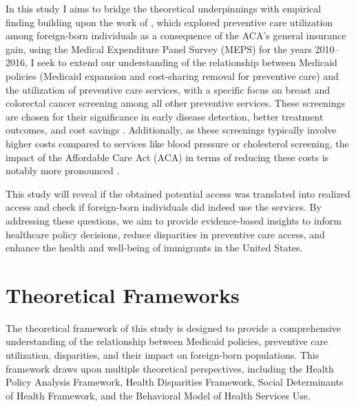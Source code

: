\documentclass[man]{apa7}
\begin{document}
In this study I aims to bridge the theoretical underpinnings with empirical finding  building upon the work of \parencite{li_gains_2021}, which explored preventive care utilization among foreign-born individuals as a consequence of the ACA's general insurance gain, using the Medical Expenditure Panel Survey (MEPS) for the years 2010–2016, I seek to extend our understanding of the relationship between Medicaid policies (Medicaid expansion and cost-sharing removal for preventive care) and the utilization of preventive care services, with a specific focus on breast and colorectal cancer screening among all other preventive services. 
These screenings are chosen for their significance in early disease detection, better treatment outcomes, and cost savings \parencite{xu_impact_2020}. Additionally, as these screenings typically involve higher costs compared to services like blood pressure or cholesterol screening, the impact of the Affordable Care Act (ACA) in terms of reducing these costs is notably more pronounced \parencite{gordon_spending_2022}.
 
 
 This study will reveal if the obtained potential access was translated into realized access and check if foreign-born individuals did indeed use the services. By addressing these questions, we aim to provide evidence-based insights to inform healthcare policy decisions, reduce disparities in preventive care access, and enhance the health and well-being of immigrants in the United States.

\section{Theoretical Frameworks}

The theoretical framework of this study is designed to provide a comprehensive understanding of the relationship between Medicaid policies, preventive care utilization, disparities, and their impact on foreign-born populations. This framework draws upon multiple theoretical perspectives, including the Health Policy Analysis Framework, Health Disparities Framework, Social Determinants of Health Framework, and the Behavioral Model of Health Services Use.
\end{document}
